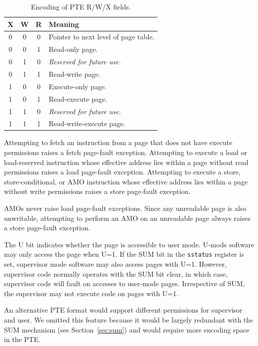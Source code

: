 \begin{table}[h!]
\begin{center}
\begin{tabular}{|c|c|c||l|}
\hline
X & W & R & Meaning \\
\hline
0 & 0 & 0 & Pointer to next level of page table. \\
0 & 0 & 1 & Read-only page. \\
0 & 1 & 0 & {\em Reserved for future use.} \\
0 & 1 & 1 & Read-write page. \\
1 & 0 & 0 & Execute-only page. \\
1 & 0 & 1 & Read-execute page. \\
1 & 1 & 0 & {\em Reserved for future use.} \\
1 & 1 & 1 & Read-write-execute page. \\
\hline
\end{tabular}
\end{center}
\caption{Encoding of PTE R/W/X fields.}
\label{pteperm}
\end{table}

Attempting to fetch an instruction from a page that does not have execute
permissions raises a fetch page-fault exception.  Attempting to execute
a load or load-reserved instruction whose effective address lies within
a page without read permissions raises a load page-fault exception.
Attempting to execute a store, store-conditional,
or AMO instruction whose effective address lies within a page without
write permissions raises a store page-fault exception.
\begin{commentary}
AMOs never raise load page-fault exceptions.  Since any unreadable page is
also unwritable, attempting to perform an AMO on an unreadable page always
raises a store page-fault exception.
\end{commentary}

The U bit indicates whether the page is accessible to user mode.
U-mode software may only access the page when U=1.  If the SUM bit
in the {\tt sstatus} register is
set, supervisor mode software may also access pages with U=1.
However, supervisor code normally operates with the SUM bit clear, in
which case, supervisor code will fault on accesses to user-mode pages.
Irrespective of SUM, the supervisor may not execute code on pages with U=1.

\begin{commentary}
An alternative PTE format would support different permissions for supervisor
and user.  We omitted this feature because it would be largely redundant with
the SUM mechanism (see Section~\ref{sec:sum}) and would require more encoding
space in the PTE.
\end{commentary}

